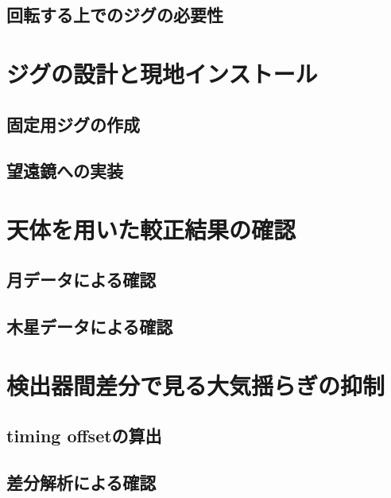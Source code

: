 \subsection{回転する上でのジグの必要性}

\section{ジグの設計と現地インストール}

\subsection{固定用ジグの作成}

\subsection{望遠鏡への実装}

\section{天体を用いた較正結果の確認}

\subsection{月データによる確認}

\subsection{木星データによる確認}

\section{検出器間差分で見る大気揺らぎの抑制}

\subsection{timing offsetの算出}

\subsection{差分解析による確認}
